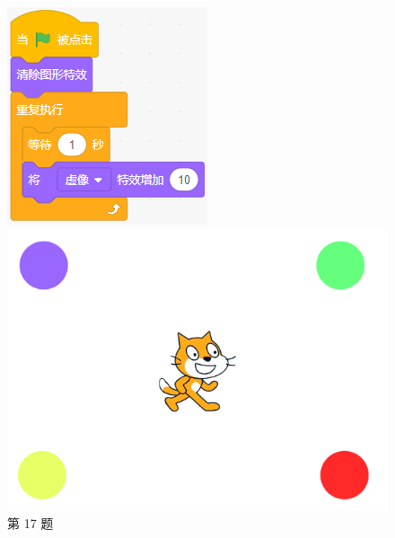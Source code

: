 \documentclass[10pt, a4paper]{article}
\begin{document}
\begin{enumerate}
        \begin{figure}[htbp]
            \centering
            \begin{minipage}[t]{.15\textwidth}
                \centering
                \includegraphics[width=\textwidth]{figure/17.png}
                \caption*{第 17 题}
            \end{minipage}
            \begin{minipage}[t]{.4\textwidth}
                \centering
                \begin{minipage}[t]{.5\textwidth}
                    \centering
                    \includegraphics[width=\textwidth]{figure/18-1.png}

\end{minipage}
\end{minipage}
\end{figure}
\end{enumerate}
\end{document}
